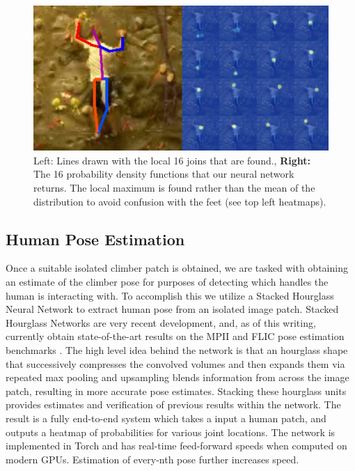 \documentclass{chi2009}
\begin{document}
\begin{figure}[t]
  \centering
  \includegraphics[keepaspectratio, width=\textwidth]{figs/pose.png}
  \caption{Left: \normalfont Lines drawn with the local 16 joins that are found., \textbf{Right:} The 16 probability density functions that our neural network returns. The local maximum is found rather than the mean of the distribution to avoid confusion with the feet (see top left heatmaps).}
  \label{fig:user}
\end{figure}

\subsection{Human Pose Estimation}

Once a suitable isolated climber patch is obtained, we are tasked with obtaining an estimate of the climber pose for purposes of detecting which handles the human is interacting with. To accomplish this we utilize a Stacked Hourglass Neural Network to extract human pose from an isolated image patch. Stacked Hourglass Networks are very recent development, and, as of this writing, currently obtain state-of-the-art results on the MPII and FLIC pose estimation benchmarks \cite{newell2016stacked}. The high level idea behind the network is that an hourglass shape that successively compresses the convolved volumes and then expands them via repeated max pooling and upsampling blends information from across the image patch, resulting in more accurate pose estimates. Stacking these hourglass units provides estimates and verification of previous results within the network. The result is a fully end-to-end system which takes a input a human patch, and outputs a heatmap of probabilities for various joint locations. The network is implemented in Torch and has real-time feed-forward speeds when computed on modern GPUs. Estimation of every-nth pose further increases speed.
\end{document}
